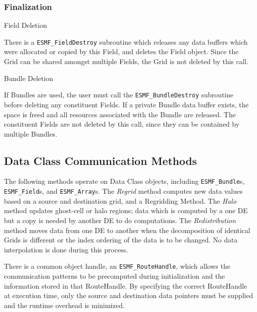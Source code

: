 \subsubsection{Finalization}

\begin{description}

\item{Field Deletion}

There is a {\tt ESMF\_FieldDestroy} subroutine which releases
any data buffers which were allocated or copied by this Field,
and deletes the Field object.  Since the Grid can be shared
amongst multiple Fields, the Grid is not deleted by this call.

\item{Bundle Deletion}

If Bundles are used, the user must call the 
{\tt ESMF\_BundleDestroy} subroutine before deleting any constituent
Fields.  If a private Bundle data buffer exists, the space is
freed and all resources associated with the Bundle are released.
The constituent Fields are not deleted by this call, since they
can be contained by multiple Bundles.

\end{description}



\subsection{Data Class Communication Methods}

The following methods operate on Data Class objects, including
{\tt ESMF\_Bundle}s, {\tt ESMF\_Field}s, and {\tt ESMF\_Array}s.
The {\it Regrid} method computes new data values based on a source
and destination grid, and a Regridding Method.  The {\it Halo} 
method updates ghost-cell or halo regions; data which is computed
by a one DE but a copy is needed by another DE to do computations.
The {\it Redistribution} method moves data from one DE to another
when the decomposition of identical Grids is different or the
index ordering of the data is to be changed.  No data
interpolation is done during this process.

There is a common object handle, an {\tt ESMF\_RouteHandle}, which
allows the communication patterns to be precomputed during initialization
and the information stored in that RouteHandle.
By specifying the correct RouteHandle at execution time, only
the source and destination data pointers must be supplied and the
runtime overhead is minimized.

